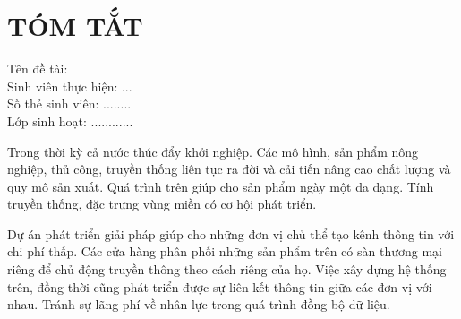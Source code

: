 \clearpage
{}
\justifying
\fontsize{13px}{13px}\selectfont
\chapter*{TÓM TẮT}

\raggedright
Tên đề tài: \project\\
Sinh viên thực hiện: ...\me \dotfill\\
Số thẻ sinh viên: ........ \msv \dotfill\\
Lớp sinh hoạt: ............ \myclass \dotfill\\
\vspace{14px}

Trong thời kỳ cả nước thúc đẩy khởi nghiệp. Các mô hình, sản phẩm nông nghiệp, thủ công, truyền thống liên tục ra đời và cải tiến nâng cao chất lượng và quy mô sản xuất. Quá trình trên giúp cho sản phẩm ngày một đa dạng. Tính truyền thống, đặc trưng vùng miền có cơ hội phát triển.

Dự án phát triển giải pháp giúp cho những đơn vị chủ thể tạo kênh thông tin với chi phí thấp. Các cửa hàng phân phối những sản phẩm trên có sàn thương mại riêng để chủ động truyền thông theo cách riêng của họ. Việc xây dựng hệ thống trên, đồng thời cũng phát triển được sự liên kết thông tin giữa các đơn vị với nhau. Tránh sự lãng phí về nhân lực trong quá trình đồng bộ dữ liệu.

	
\pagebreak
	